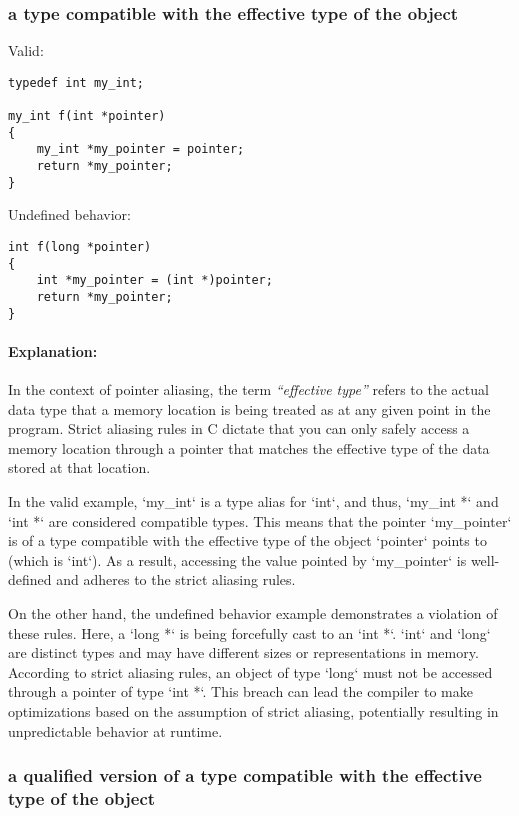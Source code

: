\documentclass[12pt]{article}
\begin{document}
\subsubsection{a type compatible with the effective type of the object}

Valid:

\begin{verbatim}
typedef int my_int;

my_int f(int *pointer)
{
    my_int *my_pointer = pointer;
    return *my_pointer;
}
\end{verbatim}

Undefined behavior:

\begin{verbatim}
int f(long *pointer)
{
    int *my_pointer = (int *)pointer;
    return *my_pointer;
}
\end{verbatim}

\paragraph{Explanation:}
In the context of pointer aliasing, the term \textit{``effective type''} refers to the actual data type that a memory location is being treated as at any given point in the program. Strict aliasing rules in C dictate that you can only safely access a memory location through a pointer that matches the effective type of the data stored at that location.

In the valid example, `my\_int` is a type alias for `int`, and thus, `my\_int *` and `int *` are considered compatible types. This means that the pointer `my\_pointer` is of a type compatible with the effective type of the object `pointer` points to (which is `int`). As a result, accessing the value pointed by `my\_pointer` is well-defined and adheres to the strict aliasing rules.

On the other hand, the undefined behavior example demonstrates a violation of these rules. Here, a `long *` is being forcefully cast to an `int *`. `int` and `long` are distinct types and may have different sizes or representations in memory. According to strict aliasing rules, an object of type `long` must not be accessed through a pointer of type `int *`. This breach can lead the compiler to make optimizations based on the assumption of strict aliasing, potentially resulting in unpredictable behavior at runtime.

\subsubsection{a qualified version of a type compatible with the effective type of the object}
\end{document}
